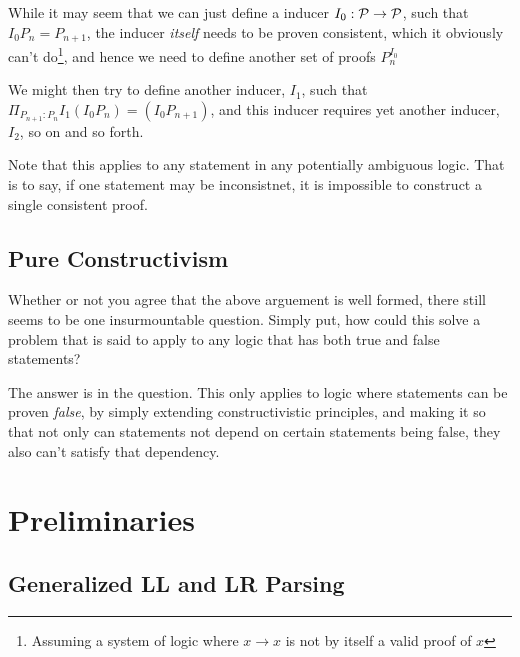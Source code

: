 While it may seem that we can just define a inducer $I_0 : \mathcal{P} \to \mathcal{P}$, such that $I_0 P_n = P_{n+1}$, the inducer \emph{itself} needs to be proven consistent, which it obviously can't do\footnote{Assuming a system of logic where $x \to x$ is not by itself a valid proof of $x$}, and hence we need to define another set of proofs $P^{I_0}_{n}$

We might then try to define another inducer, $I_1$, such that $\Pi_{P_{n+1} : P_n} I_1 (I_0 P_n) = (I_0 P_{n+1})$, and this inducer requires yet another inducer, $I_2$, so on and so forth.

Note that this applies to any statement in any potentially ambiguous logic.
That is to say, if one statement may be inconsistnet, it is impossible to construct a single consistent proof.

\subsection{Pure Constructivism}
Whether or not you agree that the above arguement is well formed, there still seems to be one insurmountable question.
Simply put, how could this solve a problem that is said to apply to any logic that has both true and false statements?

The answer is in the question. 
This only applies to logic where statements can be proven \emph{false}, by simply extending constructivistic principles, and making it so that not only can statements not depend on certain statements being false, they also can't satisfy that dependency.

\section{Preliminaries}
\subsection{Generalized LL and LR Parsing}

\label{parsehelp}

